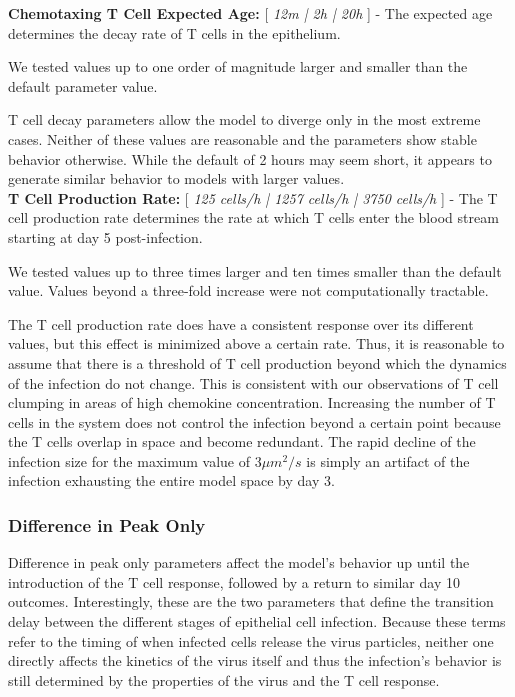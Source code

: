 \documentclass[10pt]{article}
\begin{document}
\textbf{Chemotaxing T Cell Expected Age:} [ \textit{12m | 2h | 20h} ] - The expected age determines the decay rate of T cells in the epithelium.  

We tested values up to one order of magnitude larger and smaller than the default parameter value.

T cell decay parameters allow the model to diverge only in the most extreme cases.  Neither of these values are reasonable and the parameters show stable behavior otherwise.  While the default of 2 hours may seem short, it appears to generate similar behavior to models with larger values. \\


\textbf{T Cell Production Rate:} [ \textit{125 cells/h | 1257 cells/h | 3750 cells/h} ] - The T cell production rate determines the rate at which T cells enter the blood stream starting at day 5 post-infection.

We tested values up to three times larger and ten times smaller than the default value.  Values beyond a three-fold increase were not computationally tractable.

The T cell production rate does have a consistent response over its different values, but this effect is minimized above a certain rate.  Thus, it is reasonable to assume that there is a threshold of T cell production beyond which the dynamics of the infection do not change.  This is consistent with our observations of T cell clumping in areas of high chemokine concentration.  Increasing the number of T cells in the system does not control the infection beyond a certain point because the T cells overlap in space and become redundant.  The rapid decline of the infection size for the maximum value of $3 \mu m^2/s$ is simply an artifact of the infection exhausting the entire model space by day 3.


\subsubsection{Difference in Peak Only} 

Difference in peak only parameters affect the model's behavior up until the introduction of the T cell response, followed by a return to similar day 10 outcomes.  Interestingly, these are the two parameters that define the transition delay between the different stages of epithelial cell infection. Because these terms refer to the timing of when infected cells release the virus particles, neither one directly affects the kinetics of the virus itself and thus the infection's behavior is still determined by the properties of the virus and the T cell response. \\
\end{document}

